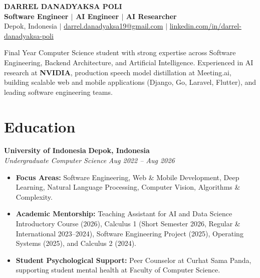 \documentclass[letterpaper,10pt]{article}
\begin{document}

\begin{center}
    {\Huge \bfseries DARREL DANADYAKSA POLI} \\[5pt]
    \small \textbf{Software Engineer $|$ AI Engineer $|$ AI Researcher} \\[3pt]
    Depok, Indonesia \quad $|$ \quad 
    \href{mailto:darrel.danadyaksa19@gmail.com}{darrel.danadyaksa19@gmail.com} \quad $|$ \quad 
    \href{https://www.linkedin.com/in/darrel-danadyaksa-poli/}{linkedin.com/in/darrel-danadyaksa-poli}
\end{center}
\vspace{-4pt}

\begin{center}
    \parbox{0.96\textwidth}{\small \centering
    Final Year Computer Science student with strong expertise across Software Engineering, Backend Architecture, and Artificial Intelligence. Experienced in AI research at \textbf{NVIDIA}, production speech model distillation at Meeting.ai, building scalable web and mobile applications (Django, Go, Laravel, Flutter), and leading software engineering teams.
    }
\end{center}
\vspace{-4pt}

\section{Education}
\vspace{2pt}

\noindent \textbf{\large University of Indonesia} \hfill \textbf{Depok, Indonesia} \\
\textit{Undergraduate Computer Science} \hfill \textit{Aug 2022 -- Aug 2026}
\begin{itemize}
    \item \textbf{Focus Areas:} Software Engineering, Web \& Mobile Development, Deep Learning, Natural Language Processing, Computer Vision, Algorithms \& Complexity.
    \item \textbf{Academic Mentorship:} Teaching Assistant for AI and Data Science Introductory Course (2026), Calculus 1 (Short Semester 2026, Regular \& International 2023--2024), Software Engineering Project (2025), Operating Systems (2025), and Calculus 2 (2024).
    \item \textbf{Student Psychological Support:} Peer Counselor at Curhat Sama Panda, supporting student mental health at Faculty of Computer Science.
\end{itemize}
\vspace{3pt}
\end{document}
